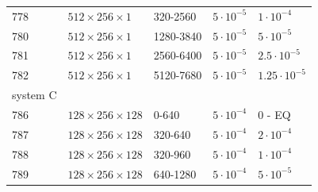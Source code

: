 \documentclass[8.5pt,twoside,twocolumn]{article}
\begin{document}
\begin{table}[htp]
\begin{tabular*}{0.495\textwidth}{lllll}
778 & $512\times256\times1$ & 320-2560& $5\cdot10^{-5}$ & $1\cdot 10^{-4}$ \\
780 & $512\times256\times1$ & 1280-3840& $5\cdot10^{-5}$ & $5\cdot 10^{-5}$ \\
781 & $512\times256\times1$ & 2560-6400& $5\cdot10^{-5}$ & $2.5\cdot 10^{-5}$ \\
782 & $512\times256\times1$ & 5120-7680& $5\cdot10^{-5}$ & $1.25\cdot 10^{-5}$ \\
\hline
system C & & & &\\
\hline
786 & $128\times256\times128$ & 0-640 & $5\cdot10^{-4}$ & 0 - EQ\\
787 & $128\times256\times128$ & 320-640 & $5\cdot10^{-4}$ & $2\cdot 10^{-4}$\\
788 & $128\times256\times128$ & 320-960 & $5\cdot10^{-4}$ & $1\cdot 10^{-4}$\\
789 & $128\times256\times128$ & 640-1280 & $5\cdot10^{-4}$ & $5\cdot 10^{-5}$\\
\hline
\end{tabular*}
\end{table}
\end{document}
